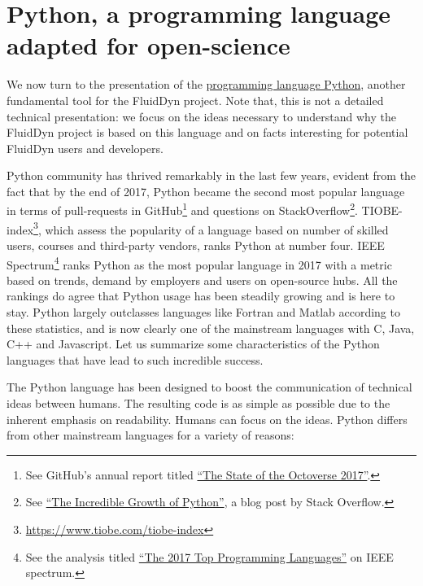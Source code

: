 \section{Python, a programming language adapted for open-science}

We now turn to the presentation of the
\href{https://www.python.org/}{programming language Python}, another
fundamental tool for the FluidDyn project.  Note that, this is not a detailed
technical presentation: we focus on the ideas necessary to understand why the
FluidDyn project is based on this language and on facts interesting for
potential FluidDyn users and developers.

Python community has thrived remarkably in the last few years, evident from the
fact that by the end of 2017, Python became the second most popular language in
terms of pull-requests in GitHub\footnote{See GitHub's annual report titled
\href{https://octoverse.github.com/}{ ``The State of the Octoverse 2017''}.} and
questions on StackOverflow\footnote{See
\href{https://stackoverflow.blog/2017/09/06/incredible-growth-python/}{ ``The
Incredible Growth of Python''}, a blog post by Stack Overflow.}.
%
TIOBE-index\footnote{\url{https://www.tiobe.com/tiobe-index}}, which assess the
popularity of a language based on number of skilled users, courses and
third-party vendors, ranks Python at number four. IEEE Spectrum\footnote{See
the analysis titled \href{https://spectrum.ieee.org/computing/software/%
the-2017-top-programming-languages}{``The 2017 Top Programming Languages''} on
IEEE spectrum.} ranks Python as the most popular language in 2017 with a metric
based on trends, demand by employers and users on open-source hubs.  All the
rankings do agree that Python usage has been steadily growing and is here to
stay.  Python largely outclasses languages like Fortran and Matlab according to
these statistics, and is now clearly one of the mainstream languages with C,
Java, C++ and Javascript.
%
Let us summarize some characteristics of the Python languages that have lead to
such incredible success.

The Python language has been designed to boost the communication of technical
ideas between humans. The resulting code is as simple as possible due to the
inherent emphasis on readability. Humans can focus on the ideas. Python differs
from other mainstream languages for a variety of reasons:

